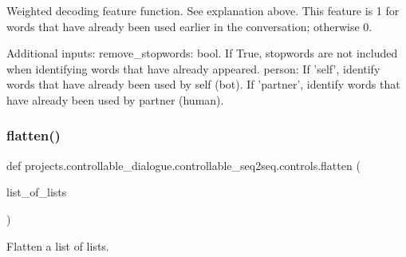 \begin{DoxyVerb}Weighted decoding feature function. See explanation above. This feature is 1 for
words that have already been used earlier in the conversation; otherwise 0.

Additional inputs:
  remove_stopwords: bool. If True, stopwords are not included when identifying words
    that have already appeared.
  person: If 'self', identify words that have already been used by self (bot).
    If 'partner', identify words that have already been used by partner (human).
\end{DoxyVerb}
 \mbox{\label{namespaceprojects_1_1controllable__dialogue_1_1controllable__seq2seq_1_1controls_a0db4b9d9584cef90aa2515a75e741774}} 
\subsubsection{\texorpdfstring{flatten()}{flatten()}}
{\footnotesize\ttfamily def projects.\+controllable\+\_\+dialogue.\+controllable\+\_\+seq2seq.\+controls.\+flatten (\begin{DoxyParamCaption}\item[{}]{list\+\_\+of\+\_\+lists }\end{DoxyParamCaption})}

\begin{DoxyVerb}Flatten a list of lists.
\end{DoxyVerb}
 \mbox{\label{namespaceprojects_1_1controllable__dialogue_1_1controllable__seq2seq_1_1controls_abf6d099074de6b0c663333470eeaa2de}} 
